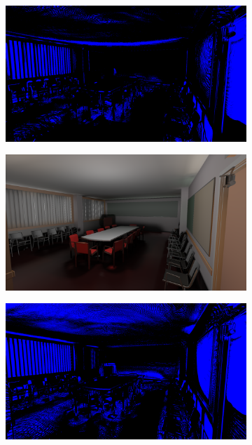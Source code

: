 \begin{figure}[H]
\begin{subfigure}[b]{.49\linewidth}
	\end{subfigure}%
	\hspace{0.01\textwidth}
	\begin{subfigure}[b]{.49\linewidth}
		\centering
		\captionsetup{justification=centering}
		\includegraphics[width=\linewidth]{media/finals/conf_gi_128_diff.png}
	\end{subfigure}%
	\par\smallskip
	\begin{subfigure}[b]{.49\linewidth}
		\centering
		\captionsetup{justification=centering}
		\includegraphics[width=\linewidth]{media/finals/conf_gi_64.png}
	\end{subfigure}%
	\hspace{0.01\textwidth}
	\begin{subfigure}[b]{.49\linewidth}
		\centering
		\captionsetup{justification=centering}
		\includegraphics[width=\linewidth]{media/finals/conf_gi_64_diff.png}

\end{subfigure}
\end{figure}
